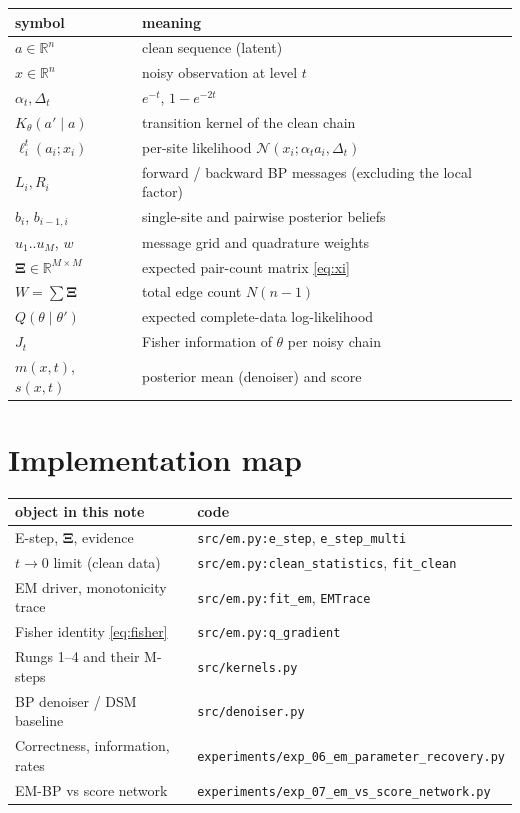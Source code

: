 \documentclass[11pt]{article}
\theoremstyle{remark}
\newcommand{\R}{\mathbb{R}}
\newcommand{\Normal}{\mathcal{N}}
\newcommand{\Xibf}{\bm{\Xi}}
\begin{document}
\begin{center}
\begin{tabular}{ll}
\toprule
symbol & meaning \\
\midrule
$a \in \R^n$ & clean sequence (latent) \\
$x \in \R^n$ & noisy observation at level $t$ \\
$\alpha_t, \Delta_t$ & $e^{-t}$, $1-e^{-2t}$ \\
$K_\theta(a'\mid a)$ & transition kernel of the clean chain \\
$\ell^t_i(a_i;x_i)$ & per-site likelihood $\Normal(x_i;\alpha_t a_i, \Delta_t)$ \\
$L_i, R_i$ & forward / backward BP messages (excluding the local factor) \\
$b_i$, $b_{i-1,i}$ & single-site and pairwise posterior beliefs \\
$u_1..u_M$, $w$ & message grid and quadrature weights \\
$\Xibf \in \R^{M\times M}$ & expected pair-count matrix \eqref{eq:xi} \\
$W = \sum \Xibf$ & total edge count $N(n-1)$ \\
$Q(\theta\mid\theta')$ & expected complete-data log-likelihood \\
$J_t$ & Fisher information of $\theta$ per noisy chain \\
$m(x,t)$, $s(x,t)$ & posterior mean (denoiser) and score \\
\bottomrule
\end{tabular}
\end{center}

\section{Implementation map}

\begin{center}
\begin{tabular}{ll}
\toprule
object in this note & code \\
\midrule
E-step, $\Xibf$, evidence & \texttt{src/em.py:e\_step}, \texttt{e\_step\_multi} \\
$t\to0$ limit (clean data) & \texttt{src/em.py:clean\_statistics}, \texttt{fit\_clean} \\
EM driver, monotonicity trace & \texttt{src/em.py:fit\_em}, \texttt{EMTrace} \\
Fisher identity \eqref{eq:fisher} & \texttt{src/em.py:q\_gradient} \\
Rungs 1--4 and their M-steps & \texttt{src/kernels.py} \\
BP denoiser / DSM baseline & \texttt{src/denoiser.py} \\
Correctness, information, rates & \texttt{experiments/exp\_06\_em\_parameter\_recovery.py} \\
EM-BP vs score network & \texttt{experiments/exp\_07\_em\_vs\_score\_network.py} \\
\bottomrule
\end{tabular}
\end{center}
\end{document}
